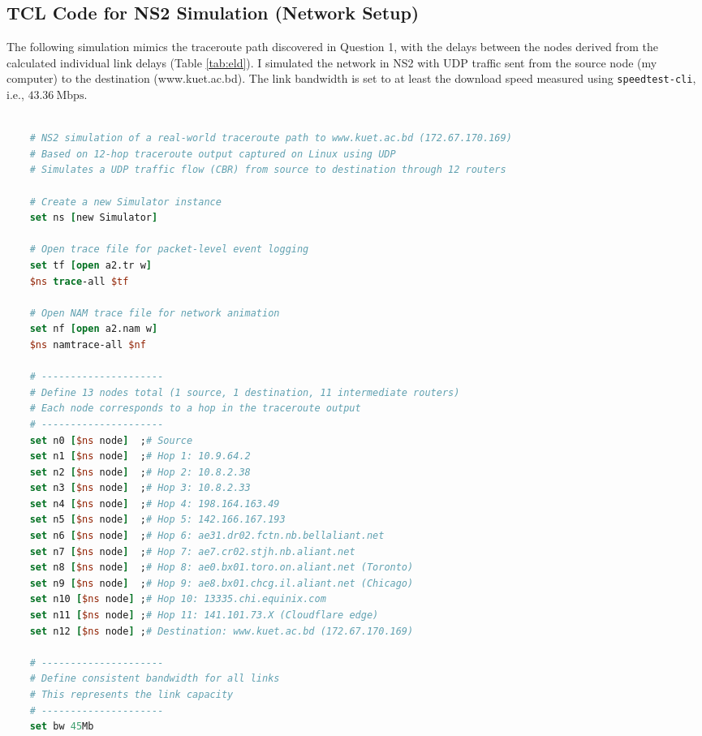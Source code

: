 \documentclass[12pt]{article}
\begin{document}
	\subsection{TCL Code for NS2 Simulation (Network Setup)}
	
	The following simulation mimics the traceroute path discovered in Question 1, with the delays between the nodes derived from the calculated individual link delays (Table \ref{tab:eld}). I simulated the network in NS2 with UDP traffic sent from the source node (my computer) to the destination (www.kuet.ac.bd). The link bandwidth is set to at least the download speed measured using \texttt{speedtest-cli}, i.e., $43.36~\mathrm{Mbps}$.
	
	\begin{adjustwidth}{-3em}{-3em}
	\begin{lstlisting}[language=tcl]
	
	# NS2 simulation of a real-world traceroute path to www.kuet.ac.bd (172.67.170.169)
	# Based on 12-hop traceroute output captured on Linux using UDP
	# Simulates a UDP traffic flow (CBR) from source to destination through 12 routers
	
	# Create a new Simulator instance
	set ns [new Simulator]
	
	# Open trace file for packet-level event logging
	set tf [open a2.tr w]
	$ns trace-all $tf
	
	# Open NAM trace file for network animation
	set nf [open a2.nam w]
	$ns namtrace-all $nf
	
	# ---------------------
	# Define 13 nodes total (1 source, 1 destination, 11 intermediate routers)
	# Each node corresponds to a hop in the traceroute output
	# ---------------------
	set n0 [$ns node]  ;# Source
	set n1 [$ns node]  ;# Hop 1: 10.9.64.2
	set n2 [$ns node]  ;# Hop 2: 10.8.2.38
	set n3 [$ns node]  ;# Hop 3: 10.8.2.33
	set n4 [$ns node]  ;# Hop 4: 198.164.163.49
	set n5 [$ns node]  ;# Hop 5: 142.166.167.193
	set n6 [$ns node]  ;# Hop 6: ae31.dr02.fctn.nb.bellaliant.net
	set n7 [$ns node]  ;# Hop 7: ae7.cr02.stjh.nb.aliant.net
	set n8 [$ns node]  ;# Hop 8: ae0.bx01.toro.on.aliant.net (Toronto)
	set n9 [$ns node]  ;# Hop 9: ae8.bx01.chcg.il.aliant.net (Chicago)
	set n10 [$ns node] ;# Hop 10: 13335.chi.equinix.com
	set n11 [$ns node] ;# Hop 11: 141.101.73.X (Cloudflare edge)
	set n12 [$ns node] ;# Destination: www.kuet.ac.bd (172.67.170.169)
	
	# ---------------------
	# Define consistent bandwidth for all links
	# This represents the link capacity
	# ---------------------
	set bw 45Mb
	

\end{lstlisting}
\end{adjustwidth}
\end{document}
